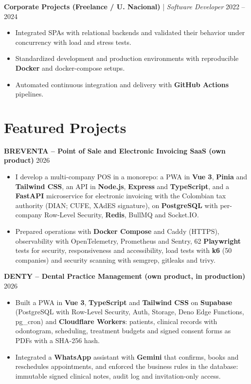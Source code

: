 \documentclass[11pt,a4paper]{article}
\begin{document}
\vspace{0.2cm}

\noindent
\textbf{Corporate Projects (Freelance / U. Nacional)} | \textit{Software Developer} \hfill 2022 – 2024
\begin{itemize}[leftmargin=*, noitemsep, topsep=2pt]
    \item Integrated SPAs with relational backends and validated their behavior under concurrency with load and stress tests.
    \item Standardized development and production environments with reproducible \textbf{Docker} and docker-compose setups.
    \item Automated continuous integration and delivery with \textbf{GitHub Actions} pipelines.
\end{itemize}

\section*{Featured Projects}

\noindent
\textbf{BREVENTA – Point of Sale and Electronic Invoicing SaaS (own product)} \hfill 2026
\begin{itemize}[leftmargin=*, noitemsep, topsep=2pt]
    \item I develop a multi-company POS in a monorepo: a PWA in \textbf{Vue 3}, \textbf{Pinia} and \textbf{Tailwind CSS}, an API in \textbf{Node.js}, \textbf{Express} and \textbf{TypeScript}, and a \textbf{FastAPI} microservice for electronic invoicing with the Colombian tax authority (DIAN; CUFE, XAdES signature), on \textbf{PostgreSQL} with per-company Row-Level Security, \textbf{Redis}, BullMQ and Socket.IO.
    \item Prepared operations with \textbf{Docker Compose} and Caddy (HTTPS), observability with OpenTelemetry, Prometheus and Sentry, 62 \textbf{Playwright} tests for security, responsiveness and accessibility, load tests with \textbf{k6} (50 companies) and security scanning with semgrep, gitleaks and trivy.
\end{itemize}

\vspace{0.2cm}

\noindent
\textbf{DENTY – Dental Practice Management (own product, in production)} \hfill 2026
\begin{itemize}[leftmargin=*, noitemsep, topsep=2pt]
    \item Built a PWA in \textbf{Vue 3}, \textbf{TypeScript} and \textbf{Tailwind CSS} on \textbf{Supabase} (PostgreSQL with Row-Level Security, Auth, Storage, Deno Edge Functions, pg\_cron) and \textbf{Cloudflare Workers}: patients, clinical records with odontogram, scheduling, treatment budgets and signed consent forms as PDFs with a SHA-256 hash.
    \item Integrated a \textbf{WhatsApp} assistant with \textbf{Gemini} that confirms, books and reschedules appointments, and enforced the business rules in the database: immutable signed clinical notes, audit log and invitation-only access.
\end{itemize}
\end{document}
